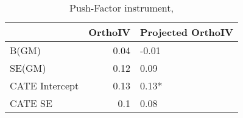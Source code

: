 \begin{table}\centering\caption{Push-Factor instrument, }\begin{tabular}{lrl}
\toprule
                &   OrthoIV & Projected OrthoIV   \\
\midrule
 B(GM)          &      0.04 & -0.01               \\
 SE(GM)         &      0.12 & 0.09                \\
 CATE Intercept &      0.13 & 0.13*               \\
 CATE SE        &      0.1  & 0.08                \\
\bottomrule
\end{tabular}\end{table}